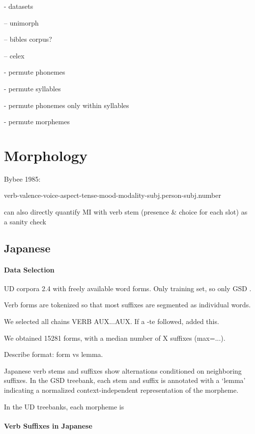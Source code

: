 - datasets

-- unimorph

-- bibles corpus?

-- celex


- permute phonemes

- permute syllables

- permute phonemes only within syllables

- permute morphemes 

\section{Morphology}

Bybee 1985:

verb-valence-voice-aspect-tense-mood-modality-subj.person-subj.number

can also directly quantify MI with verb stem (presence \& choice for each slot) as a sanity check


\subsection{Japanese}


\paragraph{Data Selection}

UD corpora 2.4 with freely available word forms. Only training set, so only GSD \cite{tanaka2016universal, asahara2018universal}.

Verb forms are tokenized so that most suffixes are segmented as individual words.

We selected all chains VERB AUX...AUX. If a -te followed, added this.

We obtained 15281 forms, with a median number of X suffixes (max=...).

Describe format: form vs lemma.


Japanese verb stems and suffixes show alternations conditioned on neighboring suffixes.
In the GSD treebank, each stem and suffix is annotated with a `lemma' indicating a normalized context-independent representation of the morpheme.

In the UD treebanks, each morpheme is 


\paragraph{Verb Suffixes in Japanese}

